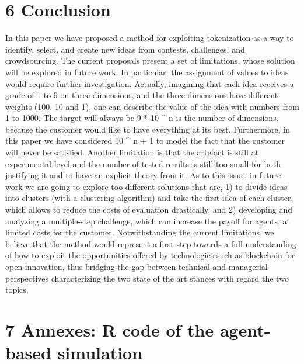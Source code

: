 \documentclass[]{elsarticle} %
\begin{document}
\section{6 Conclusion}\label{conclusion}

In this paper we have proposed a method for exploiting tokenization as a
way to identify, select, and create new ideas from contests, challenges,
and crowdsourcing. The current proposals present a set of limitations,
whose solution will be explored in future work. In particular, the
assignment of values to ideas would require further investigation.
Actually, imagining that each idea receives a grade of 1 to 9 on three
dimensions, and the three dimensions have different weights (100, 10 and
1), one can describe the value of the idea with numbers from 1 to 1000.
The target will always be 9 * 10 \^{} n is the number of dimensions,
because the customer would like to have everything at its best.
Furthermore, in this paper we have considered 10 \^{} n + 1 to model the
fact that the customer will never be satisfied. Another limitation is
that the artefact is still at experimental level and the number of
tested results is still too small for both justifying it and to have an
explicit theory from it. As to this issue, in future work we are going
to explore too different solutions that are, 1) to divide ideas into
clusters (with a clustering algorithm) and take the first idea of each
cluster, which allows to reduce the costs of evaluation drastically, and
2) developing and analyzing a multiple-step challenge, which can
increase the payoff for agents, at limited costs for the customer.
Notwithstanding the current limitations, we believe that the method
would represent a first step towards a full understanding of how to
exploit the opportunities offered by technologies such as blockchain for
open innovation, thus bridging the gap between technical and managerial
perspectives characterizing the two state of the art stances with regard
the two topics.

\section{7 Annexes: R code of the agent-based
simulation}\label{annexes-r-code-of-the-agent-based-simulation}
\end{document}
